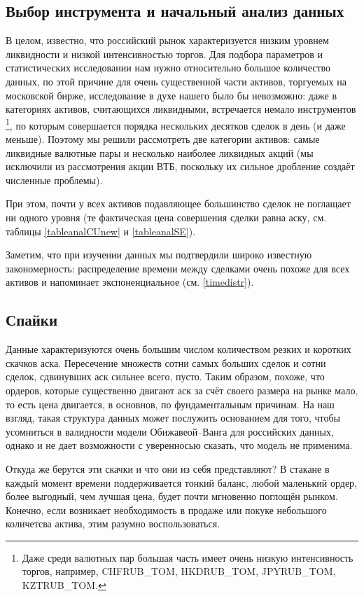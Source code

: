 \subsection{Выбор инструмента и начальный анализ данных} \label{InitAnal}
В целом, известно, что российский рынок характеризуется низким уровнем ликвидности и низкой интенсивностью торгов. 
Для подбора параметров и статистических исследовании
нам нужно относительно большое количество данных, по этой причине
для очень существенной части активов, торгуемых на московской бирже, 
исследование в духе нашего было бы невозможно: даже в категориях 
активов, считающихся ликвидными,
встречается немало инструментов \footnote{Даже среди валютных пар большая 
часть имеет очень низкую интенсивность торгов, например, CHFRUB\_TOM, HKDRUB\_TOM, 
JPYRUB\_TOM, KZTRUB\_TOM.}, по которым совершается порядка нескольких десятков сделок в день (и даже меньше). 
Поэтому мы решили рассмотреть две категории активов: самые ликвидные валютные пары
и несколько наиболее ликвидных акций (мы исключили из рассмотрения акции ВТБ, поскольку их сильное дробление создаёт 
численные проблемы).
\par
При этом, почти у всех активов подавляющее большинство сделок не поглащает ни одного уровня 
(те фактическая цена совершения сделки равна аску, см. таблицы \ref{tableanalCUnew} и \ref{tableanalSE}). 
\par
Заметим, что при изучении данных мы подтвердили широко известную закономерность: 
распределение времени между сделками очень похоже для всех активов и напоминает экспоненциальное 
(см. \ref{timedistr}).


\subsection{Спайки}

Данные характеризуются очень большим числом количеством резких и коротких скачков аска. 
Пересечение множеств
сотни самых больших сделок и сотни сделок, сдвинувших аск сильнее всего, пусто. Таким образом, похоже, что ордеров,
которые существенно двигают аск за счёт своего размера на рынке мало, то есть цена двигается, в основнов, по фундаментальным причинам.
На наш взгляд, такая структура данных может послужить основанием для того, чтобы усомниться в валидности модели Обижавеой--Ванга 
для российских данных, однако и не дает возможности с уверенносью сказать, что модель не применима. 
\par
Откуда же берутся эти скачки и что они из себя представляют? В стакане в каждый момент времени поддерживается тонкий баланс, любой
маленький ордер, более выгодный, чем лучшая цена, будет почти мгновенно поглощён рынком. Конечно, если возникает необходимость в продаже
или покуке небольшого количетсва актива, этим разумно воспользоваться.

